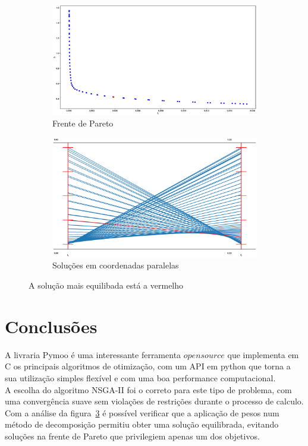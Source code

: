 \documentclass[a4paper,12pt]{article}
\begin{document}
\begin{figure}[!htbp]
\centering
\begin{subfigure}{.5\textwidth}
  \centering
  \includegraphics[width=.99\linewidth]{PS_objSpace.eps}
  \caption{Frente de Pareto}
  \label{fig:sub1}
\end{subfigure}%
\begin{subfigure}{.5\textwidth}
  \centering
  \includegraphics[width=.99\linewidth]{PS_parallel_coord.eps}
  \caption{Soluções em coordenadas paralelas}
  \label{fig:sub2}
\end{subfigure}
\caption{\label{fig:defIm2}A solução mais equilibada está a vermelho}
\end{figure}



\section{Conclusões}

A livraria Pymoo é uma interessante ferramenta $open source$ que implementa em C os principais algoritmos de otimização, com um API em python que torna a sua utilização simples flexível e com uma boa performance computacional.\\
A escolha do algoritmo NSGA-II foi o correto para este tipo de problema, com uma convergência suave sem violações de restrições durante o processo de calculo.\\
Com a análise da figura~\ref{fig:defIm2} é possível verificar que a aplicação de pesos num método de decomposição permitiu obter uma solução equilibrada, evitando soluções na frente de Pareto que privilegiem apenas um dos objetivos.\\
\end{document}
